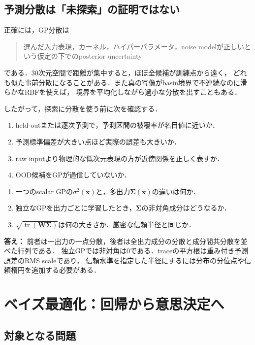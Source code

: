 \documentclass[a4paper,11pt]{ltjsarticle}
\newcommand{\tr}{\operatorname{tr}}
\begin{document}
\subsection{予測分散は「未探索」の証明ではない}

正確には，GP分散は
\begin{quote}
選んだ入力表現，カーネル，ハイパーパラメータ，noise modelが正しいという仮定の下でのposterior uncertainty
\end{quote}
である．30次元空間で距離が集中すると，ほぼ全候補が訓練点から遠く，
どれも似た事前分散になることがある．また真の写像がbasin境界で不連続なのに滑らかなRBFを使えば，
境界を平均化しながら過小な分散を出すこともある．

したがって，探索に分散を使う前に次を確認する．
\begin{enumerate}
  \item held-outまたは逐次予測で，予測区間の被覆率が名目値に近いか．
  \item 予測標準偏差が大きい点ほど実際の誤差も大きいか．
  \item raw inputより物理的な低次元表現の方が近傍関係を正しく表すか．
  \item OOD候補をGPが過信していないか．
\end{enumerate}

\begin{checkpointbox}
\begin{enumerate}
  \item 一つのscalar GPの\(\sigma^2(\bm x)\)と，多出力\(\bm\Sigma(\bm x)\)の違いは何か．
  \item 独立なGPを出力ごとに学習したとき，\(\bm\Sigma\)の非対角成分はどうなるか．
  \item \(\sqrt{\tr(\bm W\bm\Sigma)}\)は何の大きさか．厳密な信頼半径と同じか．
\end{enumerate}
\textbf{答え：} 前者は一出力の一点分散，後者は全出力成分の分散と成分間共分散を並べた行列である．
独立GPでは非対角は0である．traceの平方根は重み付き予測誤差のRMS scaleであり，
信頼水準を指定した半径にするには分布の分位点や信頼楕円を追加する必要がある．
\end{checkpointbox}

\section{ベイズ最適化：回帰から意思決定へ}
\label{sec:bayesian-optimization}

\subsection{対象となる問題}
\end{document}
